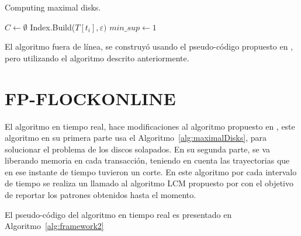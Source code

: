 \begin{algorithm}
    \renewcommand{\algorithmicrequire}{\textbf{Input:}}
    \renewcommand{\algorithmicensure}{\textbf{Output:}}
    \renewcommand{\algorithmicprint}{\textbf{break}}
  \caption{Computing maximal disks.}
  \label{alg:maximalDisks}
  \footnotesize
  \begin{algorithmic}[1]
\STATE $C \leftarrow \emptyset$
\STATE Index.Build($T[t_i],\varepsilon)$ 
	\ENDIF
      \ENDFOR
    \ENDFOR
  \ENDIF
  \STATE $min\_sup \leftarrow 1$ 
\ENDFOR
\end{algorithmic}
\end{algorithm}

El algoritmo fuera de línea, se construyó usando el pseudo-código propuesto en \cite{turdu2014}, pero utilizando el algoritmo descrito anteriormente.

\section{FP-FLOCKONLINE}

El algoritmo en tiempo real, hace modificaciones al algoritmo propuesto en \cite{turdu2014},
este algoritmo en su primera parte usa el Algoritmo~\ref{alg:maximalDisks}, para solucionar el problema de los discos solapados.
En su segunda parte, se va liberando memoria en cada transacción, teniendo en cuenta las trayectorias que en ese 
instante de tiempo tuvieron un corte. En este algoritmo por cada intervalo de tiempo se realiza un llamado al 
algoritmo LCM propuesto por \cite{uno2005lcm} con el objetivo de reportar los patrones obtenidos hasta el momento.

El pseudo-código  del algoritmo en tiempo real es presentado en Algoritmo~\ref{alg:framework2}


